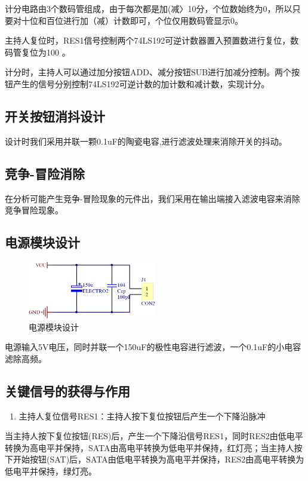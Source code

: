 \documentclass{../source/Experiment}
\begin{document}
        计分电路由3个数码管组成，由于每次都是加(减〉10分，个位数始终为0，所以只要对十位和百位进行加（减）计数即可，个位仅用数码管显示0。

        主持人复位时，RES1信号控制两个74LS192可逆计数器置入预置数进行复位，数码管复位为100 。

        计分时，主持人可以通过加分按钮ADD、减分按钮SUB进行加减分控制。两个按钮产生的信号分别控制74LS192可逆计数的加计数和减计数，实现计分。


        \subsection{开关按钮消抖设计}
        设计时我们采用并联一颗0.1uF的陶瓷电容,进行滤波处理来消除开关的抖动。
        \subsection{竞争-冒险消除}
        在分析可能产生竞争-冒险现象的元件出，我们采用在输出端接入滤波电容来消除竞争冒险现象。
        \subsection{电源模块设计}
                \begin{figure}[H]
                    \centering
                    \includegraphics[width = 0.5\textwidth]{pic/source.png}
                    \caption{电源模块设计}
                \end{figure}
            电源输入5V电压，同时并联一个150uF的极性电容进行滤波，一个0.1uF的小电容滤除高频。
        \subsection{关键信号的获得与作用}
            \begin{enumerate}
                \item 主持人复位信号RES1：主持人按下复位按钮后产生一个下降沿脉冲
            \end{enumerate}
            当主持人按下复位按钮(RES)后，产生一个下降沿信号RES1，同时RES2由低电平转换为高电平并保持，SATA由高电平转换为低电平并保持，红灯亮；当主持人按下开始按钮(SAT)后，SATA由低电平转换为高电平并保持，RES2由高电平转换为低电平并保持，绿灯亮。
            
    
\end{document}
